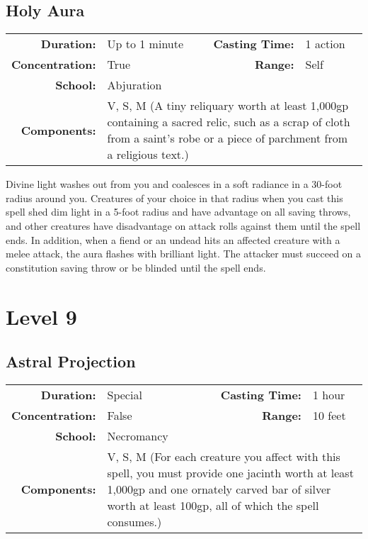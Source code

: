 \documentclass[a5paper, 12pt]{memoir}
\begin{document}
\newpage
\section*{Holy Aura}

{
\small\centering\vspace{-6pt}
\begin{tabular}{rlrl}
\toprule

\textbf{Duration:} & Up to 1 minute &
\textbf{Casting Time:} & 1 action \\
\textbf{Concentration:} & True &
\textbf{Range:} & Self \\
\textbf{School:} & Abjuration \\
\textbf{Components:} & \multicolumn{3}{p{0.7\textwidth}}{V, S, M (A tiny reliquary worth at least 1,000gp containing a sacred relic, such as a scrap of cloth from a saint's robe or a piece of parchment from a religious text.)}\\

\bottomrule
\end{tabular}
}

\vspace{1\baselineskip}\noindent Divine light washes out from you and coalesces in a soft radiance in a 30-foot radius around you. Creatures of your choice in that radius when you cast this spell shed dim light in a 5-foot radius and have advantage on all saving throws, and other creatures have disadvantage on attack rolls against them until the spell ends. In addition, when a fiend or an undead hits an affected creature with a melee attack, the aura flashes with brilliant light. The attacker must succeed on a constitution saving throw or be blinded until the spell ends.

\newpage
\chapter*{Level 9} 
\section*{Astral Projection}

{
\small\centering\vspace{-6pt}
\begin{tabular}{rlrl}
\toprule

\textbf{Duration:} & Special &
\textbf{Casting Time:} & 1 hour \\
\textbf{Concentration:} & False &
\textbf{Range:} & 10 feet \\
\textbf{School:} & Necromancy \\
\textbf{Components:} & \multicolumn{3}{p{0.7\textwidth}}{V, S, M (For each creature you affect with this spell, you must provide one jacinth worth at least 1,000gp and one ornately carved bar of silver worth at least 100gp, all of which the spell consumes.)}\\

\bottomrule
\end{tabular}
}
\end{document}
